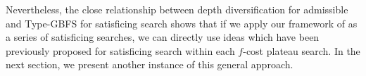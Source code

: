 Nevertheless, the close relationship between depth diversification for admissible \astar and Type-GBFS for satisficing search shows that if we apply our framework of \astar as a series of satisficing searches, we can directly use ideas which have been previously proposed for satisficing search within each $f$-cost plateau search.
In the next section, we present another instance of this general approach.

